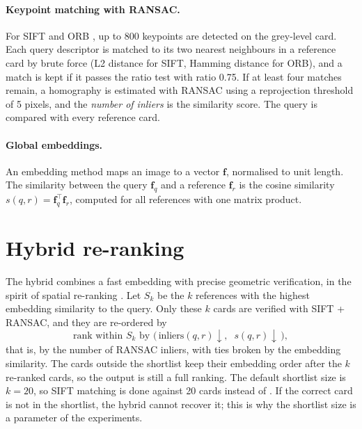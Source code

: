\paragraph{Keypoint matching with RANSAC.} For SIFT \citep{lowe2004sift} and ORB \citep{rublee2011orb}, up to 800 keypoints are detected on the grey-level card. Each query descriptor is matched to its two nearest neighbours in a reference card by brute force (L2 distance for SIFT, Hamming distance for ORB), and a match is kept if it passes the ratio test with ratio 0.75. If at least four matches remain, a homography is estimated with RANSAC \citep{fischler1981ransac} using a reprojection threshold of 5 pixels, and the \emph{number of inliers} is the similarity score. The query is compared with every reference card.

\paragraph{Global embeddings.} An embedding method maps an image to a vector $\mathbf{f}$, normalised to unit length. The similarity between the query $\mathbf{f}_q$ and a reference $\mathbf{f}_r$ is the cosine similarity $s(q,r) = \mathbf{f}_q^\top\mathbf{f}_r$, computed for all references with one matrix product.

\section{Hybrid re-ranking}
\label{sec:hybrid}

The hybrid combines a fast embedding with precise geometric verification, in the spirit of spatial re-ranking \citep{philbin2007spatial}. Let $S_k$ be the $k$ references with the highest embedding similarity to the query. Only these $k$ cards are verified with SIFT + RANSAC, and they are re-ordered by
\begin{equation}
  \text{rank within } S_k \text{ by } \big(\, \text{inliers}(q,r) \downarrow,\;\; s(q,r) \downarrow \,\big),
  \label{eq:hybrid}
\end{equation}
that is, by the number of RANSAC inliers, with ties broken by the embedding similarity. The cards outside the shortlist keep their embedding order after the $k$ re-ranked cards, so the output is still a full ranking. The default shortlist size is $k=20$, so SIFT matching is done against 20 cards instead of . If the correct card is not in the shortlist, the hybrid cannot recover it; this is why the shortlist size is a parameter of the experiments.

